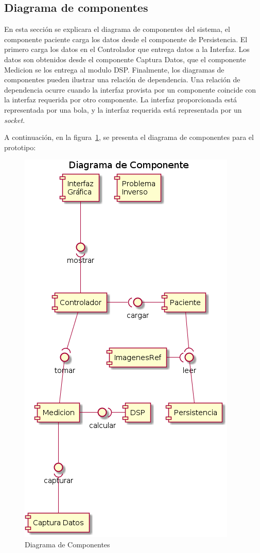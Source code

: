     \subsection{Diagrama de componentes}\label{ssc:diaComp}
    En esta sección se explicara el diagrama de componentes del sistema, el componente paciente carga los datos desde el componente de Persistencia.
    El primero carga los datos en el Controlador que entrega datos a la Interfaz.
    Los datos son obtenidos desde el componente Captura Datos, que el componente Medicion se los entrega al modulo DSP.
    Finalmente, los diagramas de componentes pueden ilustrar una relación de dependencia. Una relación de dependencia ocurre cuando la interfaz provista por un componente coincide con la interfaz requerida por otro componente. La interfaz proporcionada está representada por una bola, y la interfaz requerida está representada por un \textit{socket}.

      A continuación, en la figura~\ref{fig:componentDiagram}, se presenta el diagrama de componentes para el prototipo:

        \begin{figure}[H]
        \centering
        \includegraphics[width=0.7\linewidth]{imagenes/componentDiagram.png}
        \caption{Diagrama de Componentes}
        \label{fig:componentDiagram}
    \end{figure}

